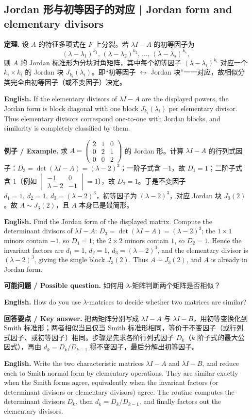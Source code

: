 \documentclass[UTF8,11pt,a4paper]{ctexart}
\newcommand{\EN}[1]{\par\noindent\textbf{English.} #1\par}
\newcommand{\EX}[2]{\par\noindent\textbf{例子 / Example.} #1\par\EN{#2}}
\newcommand{\ASK}[4]{\par\noindent\textbf{可能问题 / Possible question.} #1\par\EN{#2}\noindent\textbf{回答要点 / Key answer.} #3\par\EN{#4}\medskip}
\begin{document}
\subsection{Jordan 形与初等因子的对应 | Jordan form and elementary divisors}
\noindent\textbf{定理.} 设 $A$ 的特征多项式在 $F$ 上分裂。若 $\lambda I-A$ 的初等因子为
\[
(\lambda-\lambda_1)^{k_1},\,(\lambda-\lambda_2)^{k_2},\,\dots,\,(\lambda-\lambda_s)^{k_s},
\]
则 $A$ 的 Jordan 标准形为分块对角矩阵，其中每个初等因子 $(\lambda-\lambda_i)^{k_i}$ 对应一个 $k_i\times k_i$ 的 Jordan 块 $J_{k_i}(\lambda_i)$。即“初等因子 $\leftrightarrow$ Jordan 块”一一对应，故相似分类完全由初等因子（或不变因子）决定。
\EN{If the elementary divisors of $\lambda I-A$ are the displayed powers, the Jordan form is block diagonal with one block $J_{k_i}(\lambda_i)$ per elementary divisor. Thus elementary divisors correspond one-to-one with Jordan blocks, and similarity is completely classified by them.}
\EX{求 $A=\begin{pmatrix}2&1&0\\0&2&1\\0&0&2\end{pmatrix}$ 的 Jordan 形。计算 $\lambda I-A$ 的行列式因子：$D_3=\det(\lambda I-A)=(\lambda-2)^3$；一阶子式含 $-1$，故 $D_1=1$；二阶子式含 $1$（例如 $\begin{vmatrix}-1&0\\\lambda-2&-1\end{vmatrix}=1$），故 $D_2=1$。于是不变因子 $d_1=1,\ d_2=1,\ d_3=(\lambda-2)^3$，初等因子为 $(\lambda-2)^3$，对应 Jordan 块 $J_3(2)$。故 $A\sim J_3(2)$，且 $A$ 本身已是最简形。}{Find the Jordan form of the displayed matrix. Compute the determinant divisors of $\lambda I-A$: $D_3=\det(\lambda I-A)=(\lambda-2)^3$; the $1\times1$ minors contain $-1$, so $D_1=1$; the $2\times2$ minors contain $1$, so $D_2=1$. Hence the invariant factors are $d_1=1$, $d_2=1$, $d_3=(\lambda-2)^3$, and the elementary divisor is $(\lambda-2)^3$, giving the single block $J_3(2)$. Thus $A\sim J_3(2)$, and $A$ is already in Jordan form.}
\ASK{如何用 $\lambda$-矩阵判断两个矩阵是否相似？}{How do you use $\lambda$-matrices to decide whether two matrices are similar?}{把两矩阵分别写成 $\lambda I-A$ 与 $\lambda I-B$，用初等变换化到 Smith 标准形；两者相似当且仅当 Smith 标准形相同，等价于不变因子（或行列式因子、或初等因子）相同。步骤是先求各阶行列式因子 $D_k$（$k$ 阶子式的最大公因式），再由 $d_k=D_k/D_{k-1}$ 得不变因子，最后分解出初等因子。}{Write the two characteristic matrices $\lambda I-A$ and $\lambda I-B$, and reduce each to Smith normal form by elementary operations. They are similar exactly when the Smith forms agree, equivalently when the invariant factors (or determinant divisors or elementary divisors) agree. The routine computes the determinant divisors $D_k$, then $d_k=D_k/D_{k-1}$, and finally factors out the elementary divisors.}
\end{document}

